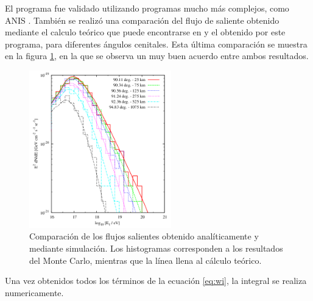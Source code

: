 		El programa fue validado utilizando programas mucho m\'as complejos, como ANIS \cite{anis}.
		Tambi\'en se realiz\'o una comparaci\'on del flujo de \tauon{} saliente obtenido mediante el calculo te\'orico que puede encontrarse en \cite{prop_tau} y el obtenido por este programa, para diferentes \'angulos cenitales.
		Esta \'ultima comparaci\'on se muestra en la figura \ref{fig:comp_tau_mc_teo}, en la que se observa un muy buen acuerdo entre ambos resultados.
		\begin{figure}[ht!]
			\begin{center}
			\includegraphics[width=0.55\textwidth]{fig/simulacionAuger/comp_tau_mc_teo}
			\caption{\label{fig:comp_tau_mc_teo} Comparaci\'on de los flujos salientes obtenido anal\'iticamente y mediante simulaci\'on. Los histogramas corresponden a los resultados del Monte Carlo, mientras que la l\'inea llena al c\'alculo te\'orico.}
			\end{center}
		\end{figure}
		
		
		Una vez obtenidos todos los términos de la ecuación \ref{eq:wi}, la integral se realiza numericamente.
		
		
		
		
		
		
		
		
		
		
		
		
		
		
		
		
		
		
		
		
		
		
		
		
		
		
		
		
		
		
		
		
		
		
		
		
		
		
		
		
		
		
		
		
		
		
		
		
		
		
		
		
		
		